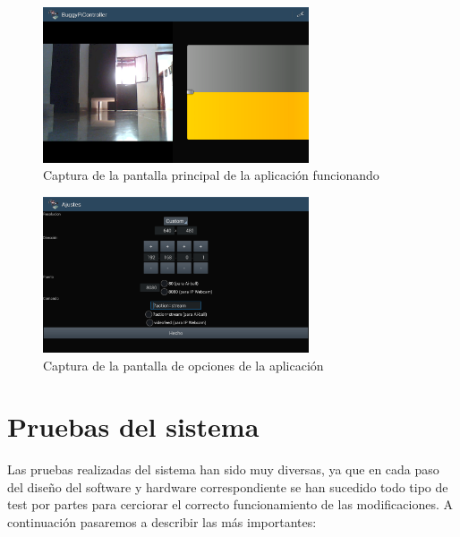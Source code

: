 \documentclass{pclass}
\begin{document}
\begin{itemize}
\begin{itemize}
	\begin{figure}[H]
		\centering
		\includegraphics[width=0.7\textwidth]{img/conectado}
		\caption{Captura de la pantalla principal de la aplicación funcionando}
		\label{fig:capturaConConexion}
	\end{figure}
	
	\begin{figure}[H]
		\centering
		\includegraphics[width=0.7\textwidth]{img/opciones}
		\caption{Captura de la pantalla de opciones de la aplicación}
		\label{fig:capturaOpciones}
	\end{figure}
	
	
	\medskip
	
\end{itemize}
\end{itemize}


\section{Pruebas del sistema} 

Las pruebas realizadas del sistema han sido muy diversas, ya que en cada paso del diseño del software y hardware correspondiente se han sucedido todo tipo de test por partes para cerciorar el correcto funcionamiento de las modificaciones. A continuación pasaremos a describir las más importantes:
\end{document}
